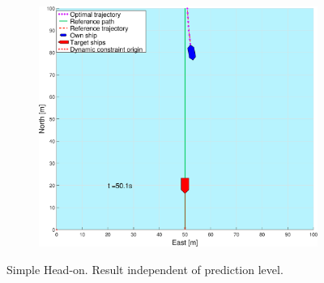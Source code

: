 \begin{figure}[ht!]
\begin{subfigure}[b]{0.49\textwidth}
        \subcaption{}
    \end{subfigure}
    \hfill
    \begin{subfigure}[b]{0.499\textwidth}
        \centering
        \includegraphics[width=\textwidth]{Images/Figures/enkel_HO/_Simple_0fig999_time=50}
        \subcaption{}
    \end{subfigure}
    \hfill
    \caption{Simple Head-on. Result independent of prediction level.}
    \label{FIG: Simple HO}
\end{figure}%

